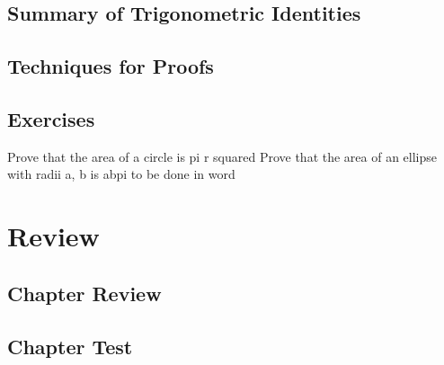 \subsection{Summary of Trigonometric Identities}
\subsection{Techniques for Proofs}
\newpage
\subsection{Exercises}
Prove that the area of a circle is pi r squared
Prove that the area of an ellipse with radii a, b is abpi
to be done in word


\newpage
\section{Review}
\subsection{Chapter Review}
\subsection{Chapter Test}